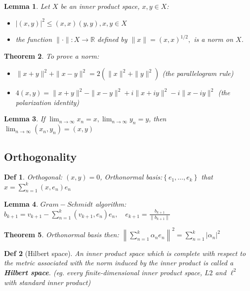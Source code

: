 \documentclass[10pt]{paper}
\newtheorem{theorem}{Theorem}[section]
\newtheorem{definition}{Def}[section]
\newtheorem{lemma}[theorem]{Lemma}
\begin{document}
\begin{lemma}
    Let $X$ be an inner product space, $x, y \in X $:
    \begin{itemize}
        \item $|(x, y)|^{2} \leq(x, x)(y, y), x, y \in X$
        \item the function $\|\cdot\|: X \rightarrow \mathbb{R}$ defined by $\|x\|=(x, x)^{1 / 2},$ is a norm on $X$.
    \end{itemize}
\end{lemma}

\begin{theorem}
    To prove a norm:
    \begin{itemize}
        \item $ \|x+y\|^{2}+\|x-y\|^{2}=2\left(\|x\|^{2}+\|y\|^{2}\right) $ (the parallelogram rule)
        \item $4(x, y)=\|x+y\|^{2}-\|x-y\|^{2}+i\|x+i y\|^{2}-i\|x-i y\|^{2}$ (the polarization identity)
    \end{itemize}
\end{theorem}

\begin{lemma}
    If $\lim _{n \rightarrow \infty} x_{n}=x, \lim _{n \rightarrow \infty} y_{n}=y$, then $\lim _{n \rightarrow \infty}\left(x_{n}, y_{n}\right)=(x, y)$
\end{lemma}

\subsection{Orthogonality}

\begin{definition}
    Orthogonal: $(x, y)=0$, Orthonormal basis:$\left\{e_{1}, \ldots, e_{k}\right\}$ that $x=\sum_{n=1}^{k}\left(x, e_{n}\right) e_{n}$
\end{definition}

\begin{lemma}
    $Gram-Schmidt$ algorithm: $b_{k+1}=v_{k+1}-\sum_{n=1}^{k}\left(v_{k+1}, e_{n}\right) e_{n}, \quad e_{k+1}=\frac{b_{k+1}}{\left\|b_{k+1}\right\|}$
\end{lemma}

\begin{theorem}
    Orthonormal basis then: $\left\|\sum_{n=1}^{k} \alpha_{n} e_{n}\right\|^{2}=\sum_{n=1}^{k}\left|\alpha_{n}\right|^{2}$
\end{theorem}

\begin{definition}[Hilbert space]
    An inner product space which is complete with respect to the metric associated with the norm induced by the inner product is called a \textbf{Hilbert space}. (eg. every finite-dimensional inner product space, $L2$ and $\ell^{2}$ with standard inner product)
\end{definition}
\end{document}
